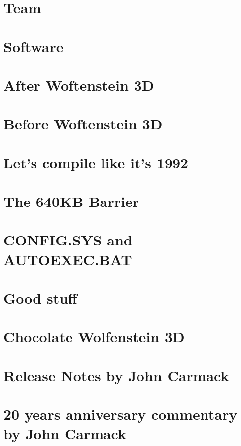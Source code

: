 \documentclass[8pt]{book}
\begin{document}
    \chapter{Team}
      
      
    \chapter{Software}
       
       
       
       
       
       
       
    \chapter{After Woftenstein 3D}
        
        
        
        
    \chapter{Before Woftenstein 3D}
        
    \appendix
    \appendixpage

    \chapter{Let's compile like it's 1992}
    \chapter{The 640KB Barrier}\label{chap:barrier640}
        
    \chapter{CONFIG.SYS and AUTOEXEC.BAT}
         
    \chapter{Good stuff}
          
    \chapter{Chocolate Wolfenstein 3D}
    \chapter{Release Notes by John Carmack}
        
    \chapter{20 years anniversary commentary by John Carmack}
        

    


\end{document}

